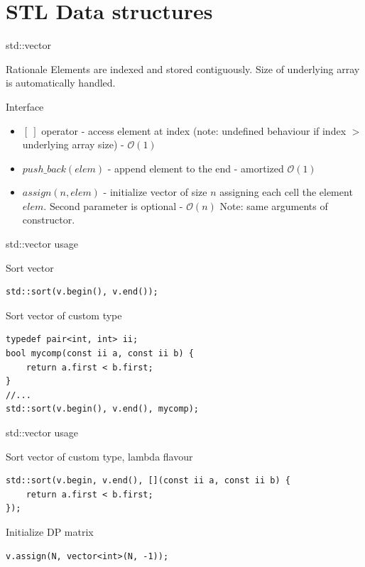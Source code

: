 \documentclass{beamer}
\begin{document}
\section{STL Data structures}
\begin{frame}{std::vector}
    \begin{block}{Rationale}
      Elements are indexed and stored contiguously. Size of underlying array is automatically handled.
    \end{block}
    \pause
    \begin{block}{Interface}
    \begin{itemize}
      \item $[~]$ operator - access element at index (note: undefined behaviour if index $>$ underlying array size) - $\mathcal{O}(1)$
      \item $push\_back(elem)$ - append element to the end - amortized $\mathcal{O}(1)$
      \item $assign(n, elem)$ - initialize vector of size $n$ assigning each cell the element $elem$. Second parameter is optional - $\mathcal{O}(n)$ Note: same arguments of constructor.
      \end{itemize}
    \end{block}
\end{frame}

\begin{frame}[fragile]{std::vector usage}
\begin{block}{Sort vector}
\begin{lstlisting}
std::sort(v.begin(), v.end());
\end{lstlisting}
\end{block}
\begin{block}{Sort vector of custom type}
\begin{lstlisting}
typedef pair<int, int> ii;
bool mycomp(const ii a, const ii b) {
	return a.first < b.first;
}
//...
std::sort(v.begin(), v.end(), mycomp);
\end{lstlisting}
\end{block}
\end{frame}
\begin{frame}[fragile]{std::vector usage}
\begin{block}{Sort vector of custom type, lambda flavour}
\begin{lstlisting}
std::sort(v.begin, v.end(), [](const ii a, const ii b) {
	return a.first < b.first;
});
\end{lstlisting}
\end{block}
\begin{block}{Initialize DP matrix}
\begin{lstlisting}
v.assign(N, vector<int>(N, -1));
\end{lstlisting}
\end{block}
\end{frame}
\end{document}
